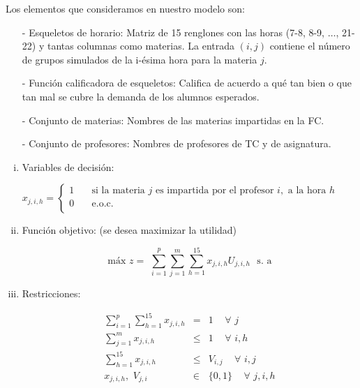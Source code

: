 
Los elementos que consideramos en nuestro modelo son:

\begin{itemize}
\item[-] Esqueletos de horario: Matriz de 15 renglones con las horas (7-8, 8-9, $\ldots$, 21-22) y tantas columnas como materias. La entrada $(i,j)$ contiene el número de grupos simulados de la i-ésima hora para la materia $j$.

\item[-] Función calificadora de esqueletos: Califica de acuerdo a qué tan bien o que tan mal se cubre la demanda de los alumnos esperados.

\item[-] Conjunto de materias: Nombres de las materias impartidas en la FC.

\item[-] Conjunto de profesores: Nombres de profesores de TC y de asignatura.
\end{itemize}

\begin{enumerate}[i)]
\item Variables de decisión:

$ x_{j,i,h} =
  \begin{cases}
1  & \quad \text{si la materia } j \text{ es impartida por el profesor  } i,\text{ a la hora } h\\
0  & \quad \text{e.o.c. } \\
\end{cases}
$

\item Función objetivo: (se desea maximizar la utilidad)

\begin{equation*}
\text{máx} \,\, z =  \,\, \displaystyle \sum_{i=1}^{p} \sum_{j=1}^{m} \sum_{h=1}^{15} x_{j,i,h} U_{j,i,h} \,\,\,\, \text{s. a}
\end{equation*}

\item Restricciones:
  
\begin{eqnarray}
\displaystyle \sum_{i=1}^{p} \sum_{h=1}^{15} x_{j,i,h} &=& 1  \,\,\,\,\,\,\, \forall \,\, j\\
\displaystyle \sum_{j=1}^{m} x_{j,i,h} &\leqslant& 1 \,\,\,\,\,\,\, \forall \,\, i,h\\
\displaystyle \sum_{h=1}^{15} x_{j,i,h} &\leqslant& V_{i,j} \,\,\,\,\,\,\, \forall \,\, i,j\\
x_{j,i,h}, \,\, V_{j,i} &\in& \{0,1\} \,\,\,\,\,\,\, \forall \,\, j,i,h
\end{eqnarray}
\end{enumerate}

